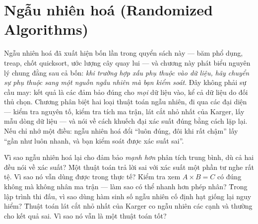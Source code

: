 \documentclass[../../algorithm.tex]{subfiles}
\begin{document}
\chapter{Ngẫu nhiên hoá (Randomized Algorithms)}

\begin{tomtat}
Ngẫu nhiên hoá đã xuất hiện bốn lần trong quyển sách này --- băm phổ dụng, treap, chốt quicksort, ước lượng cây quay lui --- và chương này phát biểu nguyên lý chung đằng sau cả bốn: \emph{khi trường hợp xấu phụ thuộc vào dữ liệu, hãy chuyển sự phụ thuộc sang một nguồn ngẫu nhiên mà bạn kiểm soát}. Đây không phải sự cầu may: kết quả là các đảm bảo đúng cho \emph{mọi} dữ liệu vào, kể cả dữ liệu do đối thủ chọn. Chương phân biệt hai loại thuật toán ngẫu nhiên, đi qua các đại diện --- kiểm tra nguyên tố, kiểm tra tích ma trận, lát cắt nhỏ nhất của Karger, lấy mẫu dòng dữ liệu --- và nói về cách khuếch đại xác suất đúng bằng cách lặp lại. Nếu chỉ nhớ một điều: ngẫu nhiên hoá đổi ``luôn đúng, đôi khi rất chậm'' lấy ``gần như luôn nhanh, và bạn kiểm soát được xác suất sai''.
\end{tomtat}

\begin{nentang}
\end{nentang}

\begin{khoigoi}
\h{Vì sao ngẫu nhiên hoá lại cho đảm bảo \emph{mạnh hơn} phân tích trung bình, dù cả hai đều nói về xác suất?}
\h{Một thuật toán trả lời sai với xác suất một phần tư nghe rất tệ. Vì sao nó vẫn dùng được trong thực tế?}
\h{Kiểm tra xem \(A \times B = C\) có đúng không mà không nhân ma trận --- làm sao có thể nhanh hơn phép nhân?}
\h{Trong lập trình thi đấu, vì sao dùng hàm sinh số ngẫu nhiên cố định hạt giống lại nguy hiểm?}
\h{Thuật toán lát cắt nhỏ nhất của Karger co ngẫu nhiên các cạnh và thường cho kết quả sai. Vì sao nó vẫn là một thuật toán tốt?}
\end{khoigoi}
\end{document}

